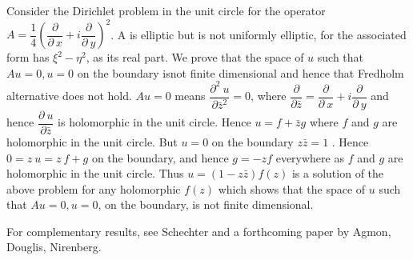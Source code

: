 Consider the Dirichlet problem in the unit circle for the operator $A
= \dfrac{1}{4} \left(\dfrac{\partial}{\partial ~ x} +
i\dfrac{\partial}{\partial ~ y}\right)^2$. A is elliptic but is not
uniformly elliptic, for the associated form has $\xi^2 - \eta^2$, as
its real part. We prove that the space of $u$ such that $Au = 0, u =
0$ on the boundary is\pageoriginale not finite dimensional and hence that Fredholm
alternative does not hold. $Au = 0$ means $\dfrac{\partial^2 ~ u}
{\partial \bar{z}^2} =0$, where $\dfrac{\partial}{\partial \bar{z}} =
\dfrac{\partial}{\partial ~ x} + i \dfrac{\partial}{\partial ~ y}$ and
hence $\dfrac{\partial ~ u}{ \partial \bar{z}}$ is holomorphic in the
unit circle. Hence $ u = f + \bar{z} g$ where $f$ and $g$ are
holomorphic in the unit circle. But $u = 0$ on the boundary $z \bar{z}
= 1$ . Hence $0= z ~ u = z ~ f + g$ on the boundary, and hence $g = -
zf$ everywhere as $f$ and $g$ are holomorphic in the unit circle. Thus
$u = (1 - z \bar{z})f(z)$ is a solution of the above problem for any
holomorphic $f(z)$ which shows that the space of $u$ such that $Au =
0, u = 0$, on the boundary, is not finite dimensional. 

For complementary results, see Schechter \cite{k15} and a forthcoming
paper by Agmon, Douglis, Nirenberg. 
